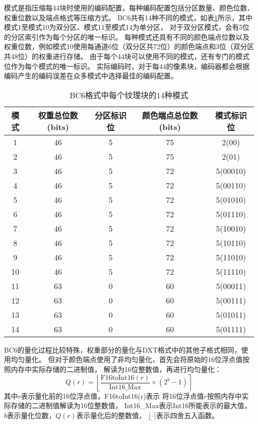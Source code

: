 模式是指压缩每4\times4块时使用的编码配置，每种编码配置包括分区数量、颜色位数、权重位数以及端点格式等压缩方式。
BC6共有14种不同的模式，如表\ref{tab:BC6Mode}所示，其中模式1至模式10为双分区、模式11至模式14为单分区，
对于双分区模式，会有5位的分区索引作为每个分区的唯一标识。
每种模式还具有不同的颜色端点位数以及权重位数，例如模式10使用每通道6位（双分区共72位）的颜色端点和3位（双分区共48位）的权重进行存储。
由于每个4\times4块可以使用不同的模式，还有专门的模式位作为每个模式的唯一标识。
实际编码时，对于每4\times4的像素块，编码器都会根据编码产生的编码误差在众多模式中选择最佳的编码配置。

\begin{table}[htbp]
    \centering
    \caption{BC6格式中每个纹理块的14种模式\cite{BC6H}}
    \label{tab:BC6Mode}        
    \begin{tabular}{ccccc}
    \toprule
    模式 & 权重总位数(bits) & 分区标识位 & 颜色端点总位数(bits) & 模式标识位\\
    \midrule
    1   &   46    &  5  &   75  &   2(00)   \\
    2   &   46    &  5  &   75  &   2(01)   \\
    3   &   46    &  5  &   72  &   5(00010)   \\
    4   &   46    &  5  &   72  &   5(00110)   \\
    5   &   46    &  5  &   72  &   5(01010)   \\
    6   &   46    &  5  &   72  &   5(01110)   \\
    7   &   46    &  5  &   72  &   5(10010)   \\
    8   &   46    &  5  &   72  &   5(10110)   \\
    9   &   46    &  5  &   72  &   5(11010)   \\
    10  &   46    &  5  &   72  &   5(11110)   \\
    11  &   63    &  0  &   60  &   5(00011)   \\
    12  &   63    &  0  &   60  &   5(00111)   \\
    13  &   63    &  0  &   60  &   5(01011)   \\
    14  &   63    &  0  &   60  &   5(01111)   \\
    \bottomrule
    \end{tabular}
\end{table}

BC6的量化过程比较特殊，权重部分的量化与DXT格式中的其他子格式相同，使用均匀量化。
但对于颜色端点使用了非均匀量化，首先会将原始的16位浮点值按照内存中实际存储的二进制值，
解读为16位整数值，再进行均匀量化：
\begin{equation}
    Q(r)=\left \lfloor \frac{\text{F16toInt16}(r)}{\text{Int16\_Max}} \times (2^{b}-1) \right \rceil
\end{equation}
其中$r$表示量化前的16位浮点值，F16toInt16(r)表示
将16位浮点值$r$按照内存中实际存储的二进制值解读为16位整数值，
Int16\_Max表示Int16所能表示的最大值，
$b$表示量化位数，$Q(r)$表示量化后的整数值，
$\lfloor \cdot \rceil$表示四舍五入函数。

